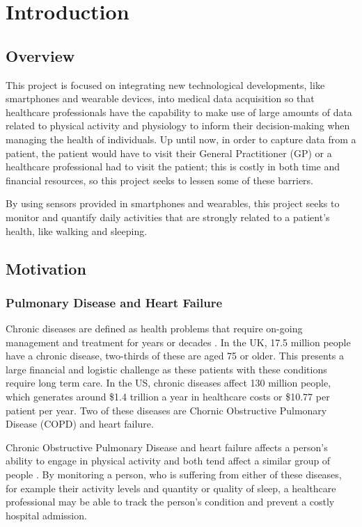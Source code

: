 \part{Introduction}

    \chapter{Overview}

        This project is focused on integrating new technological developments, like smartphones and wearable devices, into medical data acquisition so that healthcare professionals have the capability to make use of large amounts of data related to physical activity and physiology to inform their decision-making when managing the health of individuals. Up until now, in order to capture data from a patient, the patient would have to visit their General Practitioner (GP) or a healthcare professional had to visit the patient; this is costly in both time and financial resources, so this project seeks to lessen some of these barriers. 

        By using sensors provided in smartphones and wearables, this project seeks to monitor and quantify daily activities that are strongly related to a patient's health, like walking and sleeping.

    \chapter{Motivation}

        \section{Pulmonary Disease and Heart Failure}

            Chronic diseases are defined as health problems that require on-going management and treatment for years or decades \cite{chronic_diseases}. In the UK, 17.5 million people have a chronic disease, two-thirds of these are aged 75 or older. This presents a large financial and logistic challenge as these patients with these conditions require long term care. In the US, chronic diseases affect 130 million people, which generates around \$1.4 trillion a year in healthcare costs \cite{chronic_diseases} or \$10.77 per patient per year. Two of these diseases are Chornic Obstructive Pulmonary Disease (COPD) and heart failure. 

            Chronic Obstructive Pulmonary Disease and heart failure affects a person's ability to engage in physical activity and both tend affect a similar group of people \cite{copd_nhs, heart_failure_stats}. By monitoring a person, who is suffering from either of these diseases, for example their activity levels and quantity or quality of sleep, a healthcare professional may be able to track the person's condition and prevent a costly hospital admission.

